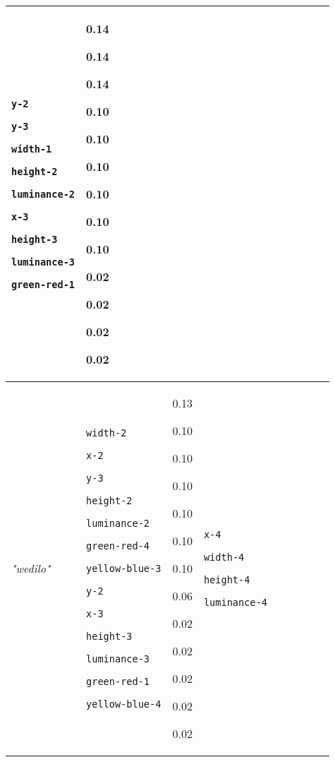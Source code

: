 {\begin{tabular}{@{}p{0.95cm}|p{1.9cm}@{}p{0.6cm}@{}|p{1.9cm}@{}p{0.6cm}@{}|p{1.9cm}@{}p{0.6cm}@{}|p{1.9cm}@{}p{0.5cm}@{}}
\texttt{y-2}

\texttt{y-3}

\texttt{width-1}

\texttt{height-2}

\texttt{luminance-2}

\texttt{x-3}

\texttt{height-3}

\texttt{luminance-3}

\texttt{green-red-1} & 0.14

0.14

0.14

0.10

0.10

0.10

0.10

0.10

0.10

0.02

0.02

0.02

0.02\\
\hline
\textit{"wedilo"} & \texttt{width-2}

\texttt{x-2}

\texttt{y-3}

\texttt{height-2}

\texttt{luminance-2}

\texttt{green-red-4}

\texttt{yellow-blue-3}

\texttt{y-2}

\texttt{x-3}

\texttt{height-3}

\texttt{luminance-3}

\texttt{green-red-1}

\texttt{yellow-blue-4} & 0.13

0.10

0.10

0.10

0.10

0.10

0.10

0.06

0.02

0.02

0.02

0.02

0.02 & \texttt{x-4}

\texttt{width-4}

\texttt{height-4}

\texttt{luminance-4}


\end{tabular}}
